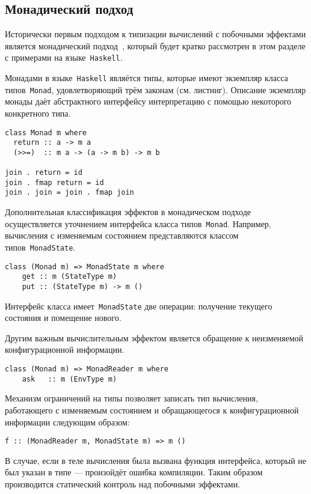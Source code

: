 \documentclass [a4paper] {article}
\begin{document}
\subsection{Монадический подход}

Исторически первым подходом к типизации вычислений с побочными эффектами
является монадический подход~\cite{Moggi:1989:CLM:77350.77353}, который будет
кратко рассмотрен в этом разделе с примерами на языке~\texttt{Haskell}.

Монадами в языке~\texttt{Haskell} являётся типы, которые имеют экземпляр
класса типов~\texttt{Monad}, удовлетворяющий трём законам
(см. листинг). Описание экземпляр монады даёт абстрактного интерфейсу
интерпретацию с помощью некоторого конкретного типа.

\begin{verbatim}
class Monad m where
  return :: a -> m a
  (>>=)  :: m a -> (a -> m b) -> m b

join . return = id
join . fmap return = id
join . join = join . fmap join
\end{verbatim}

Дополнительная классификация эффектов в монадическом подходе осуществляется
уточнением интерфейса класса типов~\texttt{Monad}. Например, вычисления с
изменяемым состоянием представляются классом типов~\texttt{MonadState}.

\begin{verbatim}
class (Monad m) => MonadState m where
    get :: m (StateType m)
    put :: (StateType m) -> m ()
\end{verbatim}

Интерфейс класса имеет~\texttt{MonadState} две операции: получение текущего
состояния и помещение нового.

Другим важным вычислительным эффектом является обращение к
неизменяемой конфигурационной информации.

\begin{verbatim}
class (Monad m) => MonadReader m where
    ask   :: m (EnvType m)
\end{verbatim}

Механизм ограничений на типы позволяет записать тип вычисления, работающего
с изменяемым состоянием и обращающегося к конфигурационной информации следующим
образом:

\begin{verbatim}
f :: (MonadReader m, MonadState m) => m ()
\end{verbatim}

В случае, если в теле вычисления была вызвана функция интерфейса,
который не был указан в типе --- произойдёт ошибка компиляции.
Таким образом производится статический контроль над побочными
эффектами.
\end{document}
